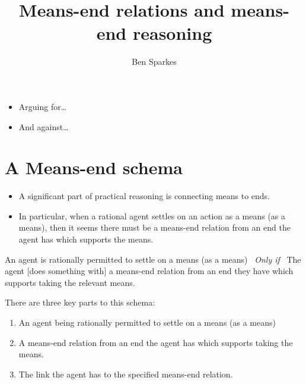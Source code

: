 \documentclass[10pt]{article}
\title{Means-end relations and means-end reasoning}
\author{Ben Sparkes}
\newenvironment{beamerblock}[1]{%
  \tcolorbox[standard,%
  no shadow,
  noparskip,
  colback=white,
  colframe=black,
  colbacktitle=white,
  coltitle=black,
  colupper=black,
  size=small,
  boxrule=.125mm,
  fonttitle=\bfseries,
  sharp corners=all,
  title=#1]}%
{\endtcolorbox}
\newcommand{\hozlinedash}[0]{%
  \noindent\hdashrule[0.5ex][c]{\textwidth}{.1pt}{2.5pt}
}
\begin{document}

\maketitle

\tableofcontents

\hozlinedash

\begin{itemize}
\item Arguing for\dots
\item And against\dots
\end{itemize}

\hozlinedash


\newpage

\section{A Means-end schema}
\label{sec:means-end-schema}


\begin{itemize}
\item A significant part of practical reasoning is connecting means to ends.
\item In particular, when a rational agent settles on an action as a means (as a means), then it seems there must be a means-end relation from an end the agent has which supports the means.
\end{itemize}

\begin{beamerblock}{Means-end schema}
  An agent is rationally permitted to settle on a means (as a means)
  \newline
  \mbox{ }\hfill\emph{Only if}\hfill\mbox{ }
  \newline
  The agent [{does something with}] a means-end relation from an end they have which supports taking the relevant means.
\end{beamerblock}

There are three key parts to this schema:
\begin{enumerate}[label=\arabic*., ref=(\arabic*)]
\item An agent being rationally permitted to settle on a means (as a means)
\item A means-end relation from an end the agent has which supports taking the means.
\item The link the agent has to the specified means-end relation.
\end{enumerate}
\end{document}
